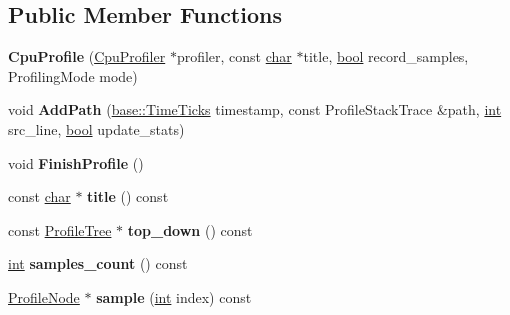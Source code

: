 \subsection*{Public Member Functions}
\begin{DoxyCompactItemize}
\item 
\mbox{\label{classv8_1_1internal_1_1CpuProfile_aa36c39e8123897635d64334c1edd6892}} 
{\bfseries Cpu\+Profile} (\mbox{\hyperlink{classv8_1_1internal_1_1CpuProfiler}{Cpu\+Profiler}} $\ast$profiler, const \mbox{\hyperlink{classchar}{char}} $\ast$title, \mbox{\hyperlink{classbool}{bool}} record\+\_\+samples, Profiling\+Mode mode)
\item 
\mbox{\label{classv8_1_1internal_1_1CpuProfile_ad82cd4539f695846d73e3c88e2b920b1}} 
void {\bfseries Add\+Path} (\mbox{\hyperlink{classv8_1_1base_1_1TimeTicks}{base\+::\+Time\+Ticks}} timestamp, const Profile\+Stack\+Trace \&path, \mbox{\hyperlink{classint}{int}} src\+\_\+line, \mbox{\hyperlink{classbool}{bool}} update\+\_\+stats)
\item 
\mbox{\label{classv8_1_1internal_1_1CpuProfile_aedabc5e7949b7fa3e6f536b203f9ac11}} 
void {\bfseries Finish\+Profile} ()
\item 
\mbox{\label{classv8_1_1internal_1_1CpuProfile_a2b3e8b23c478f528ca2f711f5a7cfc0d}} 
const \mbox{\hyperlink{classchar}{char}} $\ast$ {\bfseries title} () const
\item 
\mbox{\label{classv8_1_1internal_1_1CpuProfile_a0365f5468b19ec86090e8038172498a0}} 
const \mbox{\hyperlink{classv8_1_1internal_1_1ProfileTree}{Profile\+Tree}} $\ast$ {\bfseries top\+\_\+down} () const
\item 
\mbox{\label{classv8_1_1internal_1_1CpuProfile_a9c97b8160475d22df0e26a6de1bf5f4b}} 
\mbox{\hyperlink{classint}{int}} {\bfseries samples\+\_\+count} () const
\item 
\mbox{\label{classv8_1_1internal_1_1CpuProfile_ac9be86383767ea832380c9a0435199bd}} 
\mbox{\hyperlink{classv8_1_1internal_1_1ProfileNode}{Profile\+Node}} $\ast$ {\bfseries sample} (\mbox{\hyperlink{classint}{int}} index) const

\end{DoxyCompactItemize}
